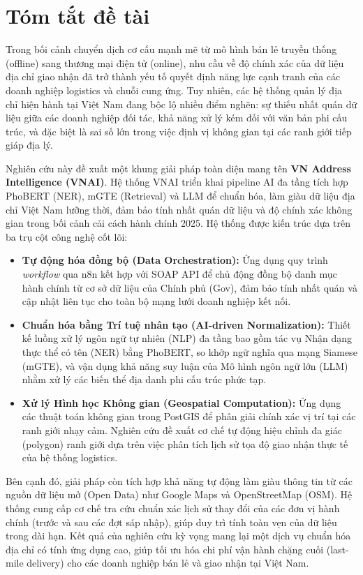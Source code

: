 \chapter*{Tóm tắt đề tài}

Trong bối cảnh chuyển dịch cơ cấu mạnh mẽ từ mô hình bán lẻ truyền thống (offline) sang thương mại điện tử (online), nhu cầu về độ chính xác của dữ liệu địa chỉ giao nhận đã trở thành yếu tố quyết định năng lực cạnh tranh của các doanh nghiệp logistics và chuỗi cung ứng. Tuy nhiên, các hệ thống quản lý địa chỉ hiện hành tại Việt Nam đang bộc lộ nhiều điểm nghẽn: sự thiếu nhất quán dữ liệu giữa các doanh nghiệp đối tác, khả năng xử lý kém đối với văn bản phi cấu trúc, và đặc biệt là sai số lớn trong việc định vị không gian tại các ranh giới tiếp giáp địa lý.

Nghiên cứu này đề xuất một khung giải pháp toàn diện mang tên \textbf{VN Address Intelligence (VNAI)}. Hệ thống VNAI triển khai pipeline AI đa tầng tích hợp PhoBERT (NER), mGTE (Retrieval) và LLM để chuẩn hóa, làm giàu dữ liệu địa chỉ Việt Nam lưỡng thời, đảm bảo tính nhất quán dữ liệu và độ chính xác không gian trong bối cảnh cải cách hành chính 2025. Hệ thống được kiến trúc dựa trên ba trụ cột công nghệ cốt lõi:

\begin{itemize}
\item \textbf{Tự động hóa đồng bộ (Data Orchestration):} Ứng dụng quy trình \textit{workflow} qua n8n kết hợp với SOAP API để chủ động đồng bộ danh mục hành chính từ cơ sở dữ liệu của Chính phủ (Gov), đảm bảo tính nhất quán và cập nhật liên tục cho toàn bộ mạng lưới doanh nghiệp kết nối.
\item \textbf{Chuẩn hóa bằng Trí tuệ nhân tạo (AI-driven Normalization):} Thiết kế luồng xử lý ngôn ngữ tự nhiên (NLP) đa tầng bao gồm tác vụ Nhận dạng thực thể có tên (NER) bằng PhoBERT, so khớp ngữ nghĩa qua mạng Siamese (mGTE), và vận dụng khả năng suy luận của Mô hình ngôn ngữ lớn (LLM) nhằm xử lý các biến thể địa danh phi cấu trúc phức tạp.
\item \textbf{Xử lý Hình học Không gian (Geospatial Computation):} Ứng dụng các thuật toán không gian trong PostGIS để phân giải chính xác vị trí tại các ranh giới nhạy cảm. Nghiên cứu đề xuất cơ chế tự động hiệu chỉnh đa giác (polygon) ranh giới dựa trên việc phân tích lịch sử tọa độ giao nhận thực tế của hệ thống logistics.
\end{itemize}

Bên cạnh đó, giải pháp còn tích hợp khả năng tự động làm giàu thông tin từ các nguồn dữ liệu mở (Open Data) như Google Maps và OpenStreetMap (OSM). Hệ thống cung cấp cơ chế tra cứu chuẩn xác lịch sử thay đổi của các đơn vị hành chính (trước và sau các đợt sáp nhập), giúp duy trì tính toàn vẹn của dữ liệu trong dài hạn. Kết quả của nghiên cứu kỳ vọng mang lại một dịch vụ chuẩn hóa địa chỉ có tính ứng dụng cao, giúp tối ưu hóa chi phí vận hành chặng cuối (last-mile delivery) cho các doanh nghiệp bán lẻ và giao nhận tại Việt Nam.